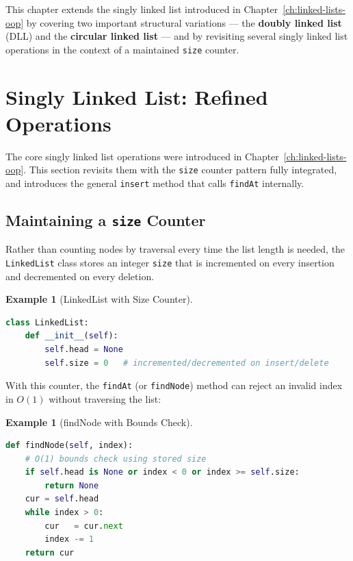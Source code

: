 \documentclass[11pt, a4paper, notitlepage]{report}
\theoremstyle{definition}
\theoremstyle{remark}
\theoremstyle{definition}
\newtheorem{example}[theorem]{Example}
\begin{document}
This chapter extends the singly linked list introduced in Chapter~\ref{ch:linked-lists-oop}
by covering two important structural variations --- the \textbf{doubly linked list}
(DLL) and the \textbf{circular linked list} --- and by revisiting several
singly linked list operations in the context of a maintained \texttt{size} counter.

\section{Singly Linked List: Refined Operations}
\label{sec:sll-refined}

The core singly linked list operations were introduced in
Chapter~\ref{ch:linked-lists-oop}. This section revisits them with the
\texttt{size} counter pattern fully integrated, and introduces the general
\texttt{insert} method that calls \texttt{findAt} internally.

\subsection{Maintaining a \texttt{size} Counter}
\label{subsec:sll-size-counter}

Rather than counting nodes by traversal every time the list length is needed,
the \texttt{LinkedList} class stores an integer \texttt{size} that is
incremented on every insertion and decremented on every deletion.

\begin{example}[LinkedList with Size Counter]
\leavevmode
\begin{lstlisting}[language=Python]
class LinkedList:
    def __init__(self):
        self.head = None
        self.size = 0   # incremented/decremented on insert/delete
\end{lstlisting}
\end{example}

With this counter, the \texttt{findAt} (or \texttt{findNode}) method can
reject an invalid index in $O(1)$ without traversing the list:

\begin{example}[findNode with Bounds Check]
\leavevmode
\begin{lstlisting}[language=Python]
def findNode(self, index):
    # O(1) bounds check using stored size
    if self.head is None or index < 0 or index >= self.size:
        return None
    cur = self.head
    while index > 0:
        cur   = cur.next
        index -= 1
    return cur
\end{lstlisting}
\end{example}
\end{document}
